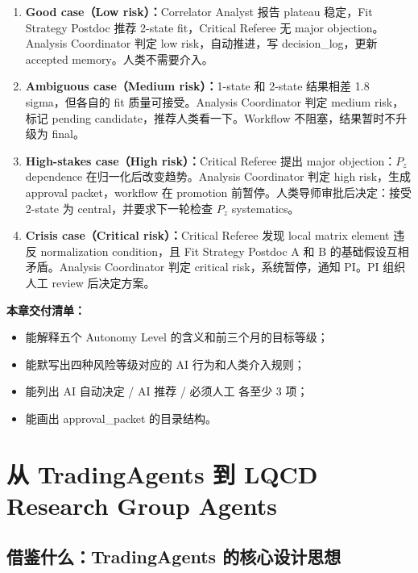 \documentclass[11pt,a4paper,fontset=fandol]{ctexart}
\begin{document}
\begin{enumerate}
  \item \textbf{Good case（Low risk）：}Correlator Analyst 报告 plateau 稳定，Fit Strategy Postdoc 推荐 2-state fit，Critical Referee 无 major objection。Analysis Coordinator 判定 low risk，自动推进，写 decision\_log，更新 accepted memory。人类不需要介入。
  
  \item \textbf{Ambiguous case（Medium risk）：}1-state 和 2-state 结果相差 1.8 sigma，但各自的 fit 质量可接受。Analysis Coordinator 判定 medium risk，标记 pending candidate，推荐人类看一下。Workflow 不阻塞，结果暂时不升级为 final。
  
  \item \textbf{High-stakes case（High risk）：}Critical Referee 提出 major objection：$P_z$ dependence 在归一化后改变趋势。Analysis Coordinator 判定 high risk，生成 approval packet，workflow 在 promotion 前暂停。人类导师审批后决定：接受 2-state 为 central，并要求下一轮检查 $P_z$ systematics。
  
  \item \textbf{Crisis case（Critical risk）：}Critical Referee 发现 local matrix element 违反 normalization condition，且 Fit Strategy Postdoc A 和 B 的基础假设互相矛盾。Analysis Coordinator 判定 critical risk，系统暂停，通知 PI。PI 组织人工 review 后决定方案。
\end{enumerate}

\textbf{本章交付清单：}
\begin{itemize}
  \item 能解释五个 Autonomy Level 的含义和前三个月的目标等级；
  \item 能默写出四种风险等级对应的 AI 行为和人类介入规则；
  \item 能列出 AI 自动决定 / AI 推荐 / 必须人工 各至少 3 项；
  \item 能画出 approval\_packet 的目录结构。
\end{itemize}

\newpage

\section{从 TradingAgents 到 LQCD Research Group Agents}

\subsection{借鉴什么：TradingAgents 的核心设计思想}
\end{document}
